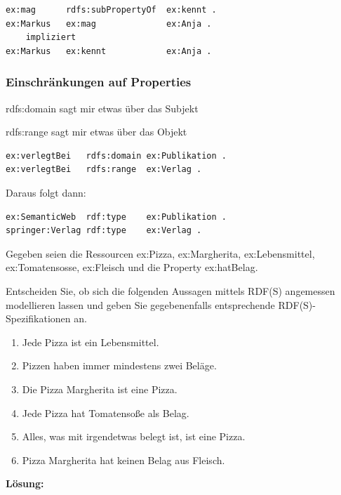 \documentclass[a4paper]{article}
\begin{document}
\begin{lstlisting}
ex:mag      rdfs:subPropertyOf  ex:kennt .
ex:Markus   ex:mag              ex:Anja .
    impliziert
ex:Markus   ex:kennt            ex:Anja .
\end{lstlisting}

\subsubsection{Einschränkungen auf Properties}

rdfs:domain sagt mir etwas über das Subjekt

rdfs:range sagt mir etwas über das Objekt

\begin{lstlisting}
ex:verlegtBei   rdfs:domain ex:Publikation .
ex:verlegtBei   rdfs:range  ex:Verlag .
\end{lstlisting}

Daraus folgt dann:

\begin{lstlisting}
ex:SemanticWeb  rdf:type    ex:Publikation .
springer:Verlag rdf:type    ex:Verlag .
\end{lstlisting}


Gegeben seien die Ressourcen ex:Pizza, ex:Margherita, ex:Lebensmittel, ex:Tomatensosse, ex:Fleisch und die Property ex:hatBelag.

Entscheiden Sie, ob sich die folgenden Aussagen mittels RDF(S) angemessen modellieren lassen und geben Sie gegebenenfalls entsprechende RDF(S)-Spezifikationen an.

\begin{enumerate}
    \item Jede Pizza ist ein Lebensmittel.
    \item Pizzen haben immer mindestens zwei Beläge.
    \item Die Pizza Margherita ist eine Pizza.
    \item Jede Pizza hat Tomatensoße als Belag.
    \item Alles, was mit irgendetwas belegt ist, ist eine Pizza.
    \item Pizza Margherita hat keinen Belag aus Fleisch.
\end{enumerate}

\textbf{Lösung:}
\end{document}
